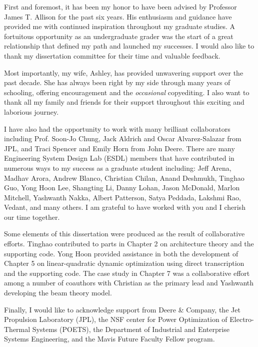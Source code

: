 First and foremost, it has been my honor to have been advised by Professor James T. Allison for the past six years.
His enthusiasm and guidance have provided me with continued inspiration throughout my graduate studies.
A fortuitous opportunity as an undergraduate grader was the start of a great relationship that defined my path and launched my successes.
I would also like to thank my dissertation committee for their time and valuable feedback.

Most importantly, my wife, Ashley, has provided unwavering support over the past decade.
She has always been right by my side through many years of schooling, offering encouragement and the \textit{occasional} copyediting.
I also want to thank all my family and friends for their support throughout this exciting and laborious journey.

I have also had the opportunity to work with many brilliant collaborators including Prof. Soon-Jo Chung, Jack Aldrich and Oscar Alvarez-Salazar from JPL, and Traci Spencer and Emily Horn from John Deere.
There are many Engineering System Design Lab (ESDL) members that have contributed in numerous ways to my success as a graduate student including: Jeff Arena, Madhav Arora, Andrew Blanco, Christian Chilan, Anand Deshmukh, Tinghao Guo, Yong Hoon Lee, Shangting Li, Danny Lohan, Jason McDonald, Marlon Mitchell, Yashwanth Nakka, Albert Patterson, Satya Peddada, Lakshmi Rao, Vedant, and many others.
I am grateful to have worked with you and I cherish our time together.

Some elements of this dissertation were produced as the result of collaborative efforts.
Tinghao contributed to parts in Chapter 2 on architecture theory and the supporting code.  
Yong Hoon provided assistance in both the development of Chapter 5 on linear-quadratic dynamic optimization using direct transcription and the supporting code.
The case study in Chapter 7 was a collaborative effort among a number of coauthors with Christian as the primary lead and Yashwanth developing the beam theory model.

Finally, I would like to acknowledge support from Deere \& Company, the Jet Propulsion Laboratory (JPL), the NSF center for Power Optimization of Electro-Thermal Systems (POETS), the Department of Industrial and Enterprise Systems Engineering, and the Mavis Future Faculty Fellow program.